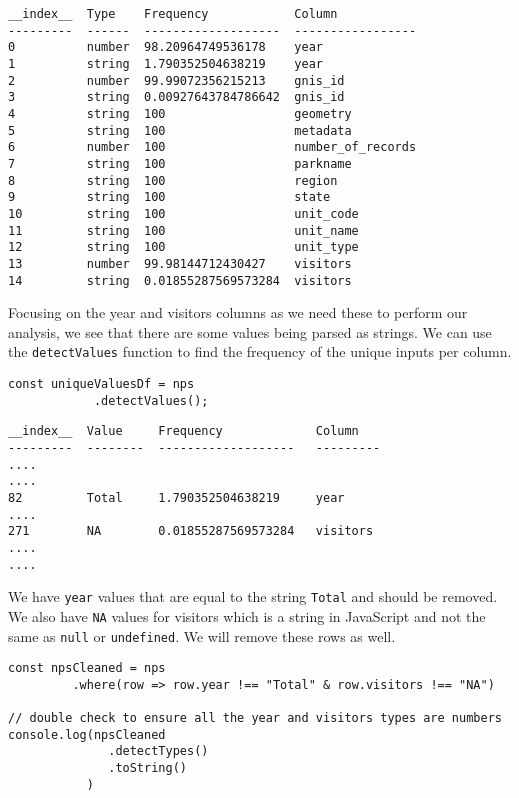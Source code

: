 \begin{verbatim}
__index__  Type    Frequency            Column           
---------  ------  -------------------  -----------------
0          number  98.20964749536178    year             
1          string  1.790352504638219    year             
2          number  99.99072356215213    gnis_id          
3          string  0.00927643784786642  gnis_id          
4          string  100                  geometry         
5          string  100                  metadata         
6          number  100                  number_of_records
7          string  100                  parkname         
8          string  100                  region           
9          string  100                  state            
10         string  100                  unit_code        
11         string  100                  unit_name        
12         string  100                  unit_type        
13         number  99.98144712430427    visitors         
14         string  0.01855287569573284  visitors  
\end{verbatim}

Focusing on the year and visitors columns
as we need these to perform our analysis, 
we see that there are some values being parsed as strings.
We can use the \texttt{detectValues} function
to find the frequency of the unique inputs per column.

\begin{verbatim}
const uniqueValuesDf = nps
            .detectValues(); 
\end{verbatim}

\begin{verbatim}
__index__  Value     Frequency             Column           
---------  --------  -------------------   ---------
....
....
82         Total     1.790352504638219     year
....
271        NA        0.01855287569573284   visitors
....
....
\end{verbatim}

We have \texttt{year} values 
that are equal to the string \texttt{Total}
and should be removed. 
We also have \texttt{NA} values for visitors
which is a string in JavaScript 
and not the same as \texttt{null} or \texttt{undefined}.
We will remove these rows as well.

\begin{verbatim}
const npsCleaned = nps
         .where(row => row.year !== "Total" & row.visitors !== "NA")

// double check to ensure all the year and visitors types are numbers
console.log(npsCleaned
              .detectTypes()
              .toString()
           )
\end{verbatim}

